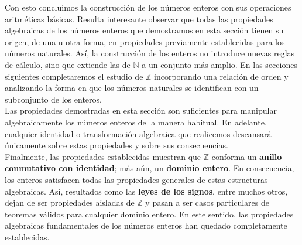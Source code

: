 \documentclass[10 pt]{article}
\begin{document}
\Large{Con esto concluimos la construcción de los números enteros con sus operaciones aritméticas básicas. Resulta interesante observar que todas las propiedades algebraicas de los números enteros que demostramos en esta sección tienen su origen, de una u otra forma, en propiedades previamente establecidas para los números naturales. Así, la construcción de los enteros no introduce nuevas reglas de cálculo, sino que extiende las de $\mathbb N$ a un conjunto más amplio. En las secciones siguientes completaremos el estudio de $\mathbb Z$ incorporando una relación de orden y analizando la forma en que los números naturales se identifican con un subconjunto de los enteros.\\

Las propiedades demostradas en esta sección son suficientes para manipular algebraicamente los números enteros de la manera habitual. En adelante, cualquier identidad o transformación algebraica que realicemos descansará únicamente sobre estas propiedades y sobre sus consecuencias. \\

Finalmente, las propiedades establecidas muestran que $\mathbb Z$ conforma un \textbf{anillo conmutativo con identidad}; más aún, un \textbf{dominio entero}. En consecuencia, los enteros satisfacen todas las propiedades generales de estas estructuras algebraicas. Así, resultados como las \textbf{leyes de los signos}, entre muchos otros, dejan de ser propiedades aisladas de $\mathbb Z$ y pasan a ser casos particulares de teoremas válidos para cualquier dominio entero. En este sentido, las propiedades algebraicas fundamentales de los números enteros han quedado completamente establecidas.} \\
\end{document}
